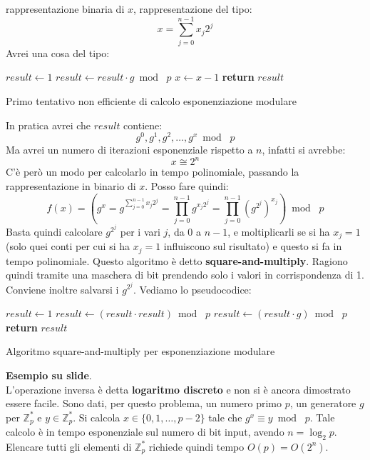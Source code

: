 \documentclass[a4paper,12pt, oneside]{book}
\begin{document}
rappresentazione binaria di $x$, rappresentazione del tipo:
\[x=\sum_{j=0}^{n-1}x_j2^j\]
Avrei una cosa del tipo:
\begin{algorithm}[H]
  \begin{algorithmic}
    \State $result\gets 1$
    \State $result \gets result \cdot g\bmod\,\,p$
    \State $x\gets x-1$
    \EndWhile
    \State \textbf{return} $result$ 
    \EndFunction
  \end{algorithmic}
  \caption{Primo tentativo non efficiente di calcolo esponenziazione modulare}
\end{algorithm}
In pratica avrei che $result$ contiene:
\[g^0,g^1,g^2,\ldots,g^x\bmod\,\,p\]
Ma avrei un numero di iterazioni esponenziale rispetto a $n$, infatti si
avrebbe: 
\[x\cong 2^n\]
C'è però un modo per calcolarlo in tempo polinomiale, passando la
rappresentazione in binario di $x$. Posso fare quindi:
\[f(x)=\left(g^x=
  g^{\sum_{j=0}^{n-1}x_j2^j}=\prod_{j=0}^{n-1}g^{x_j2^j}=\prod_{j=0}^{n-1}
  (g^{2^j})^{x_j}\right)\bmod \,\,p\] 
Basta quindi calcolare $g^{2^j}$ per i vari $j$, da 0 a $n-1$, e moltiplicarli
se si ha $x_j=1$ (solo quei conti per cui si ha $x_j=1$ influiscono sul
risultato) e questo si fa in tempo polinomiale. Questo algoritmo è detto
\textbf{square-and-multiply}. Ragiono quindi tramite una maschera di bit
prendendo solo i valori in corrispondenza di 1.\\
Conviene inoltre salvarsi i $g^{2^j}$. Vediamo lo pseudocodice:
\begin{algorithm}[H]
  \begin{algorithmic}
    \State $result\gets 1$
    \State $result \gets (result \cdot result)\bmod\,\,p$
    \State $result \gets (result \cdot g)\bmod\,\,p$
    \EndIf
    \EndFor
    \State \textbf{return} $result$ 
    \EndFunction
  \end{algorithmic}
  \caption{Algoritmo square-and-multiply per esponenziazione modulare}
\end{algorithm}
\textbf{Esempio su slide}.\\
L'operazione inversa è detta \textbf{logaritmo discreto} e non si è ancora
dimostrato essere facile. Sono dati, per questo problema, un numero primo $p$,
un generatore $g$ per $\mathbb{Z}_p^*$ e $y\in\mathbb{Z}_p^*$. Si calcola
$x\in\{0,1,\ldots,p-2\}$ tale che $g^x\equiv y\bmod\,\,p$. Tale calcolo è in
tempo esponenziale sul numero di bit input, avendo $n=\log_2p$. Elencare tutti
gli elementi di $\mathbb{Z}_p^*$ richiede quindi tempo $O(p)=O(2^n)$.\\
\end{document}
